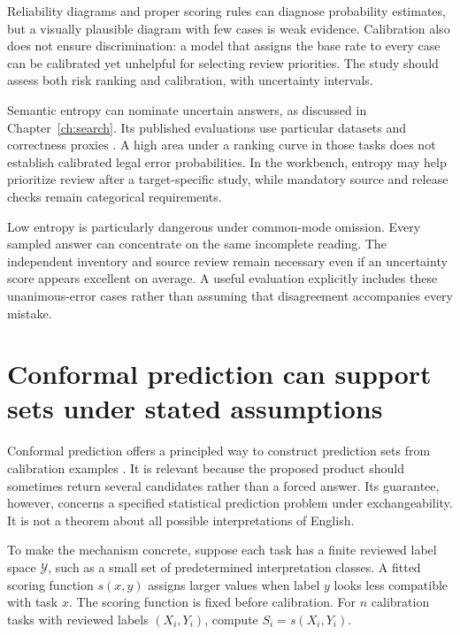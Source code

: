 \documentclass[12pt,a4paper,oneside,openany]{book}
\begin{document}
Reliability diagrams and proper scoring rules can diagnose probability estimates,
but a visually plausible diagram with few cases is weak evidence. Calibration
also does not ensure discrimination: a model that assigns the base rate to every
case can be calibrated yet unhelpful for selecting review priorities. The study
should assess both risk ranking and calibration, with uncertainty intervals.

Semantic entropy can nominate uncertain answers, as discussed in
Chapter~\ref{ch:search}. Its published evaluations use particular datasets and
correctness proxies \citep{semantic2023}. A high area under a ranking curve in
those tasks does not establish calibrated legal error probabilities. In the
workbench, entropy may help prioritize review after a target-specific study, while
mandatory source and release checks remain categorical requirements.

Low entropy is particularly dangerous under common-mode omission. Every sampled
answer can concentrate on the same incomplete reading. The independent inventory
and source review remain necessary even if an uncertainty score appears excellent
on average. A useful evaluation explicitly includes these unanimous-error cases
rather than assuming that disagreement accompanies every mistake.

\section{Conformal prediction can support sets under stated assumptions}
\label{merge:M09:09}


Conformal prediction offers a principled way to construct prediction sets from
calibration examples \citep[section 1.1 and appendix D]{conformal2022}. It is
relevant because the proposed product should sometimes return several candidates
rather than a forced answer. Its guarantee, however, concerns a specified
statistical prediction problem under exchangeability. It is not a theorem about
all possible interpretations of English.

To make the mechanism concrete, suppose each task has a finite reviewed label
space $\mathcal Y$, such as a small set of predetermined interpretation classes.
A fitted scoring function $s(x,y)$ assigns larger values when label $y$ looks less
compatible with task $x$. The scoring function is fixed before calibration.
For $n$ calibration tasks with reviewed labels $(X_i,Y_i)$, compute
$S_i=s(X_i,Y_i)$.
\end{document}
